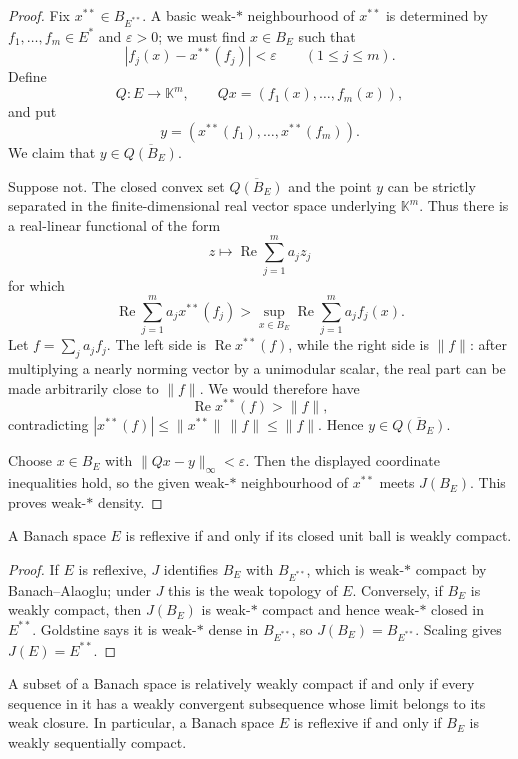 \begin{proof}
Fix $x^{**}\in B_{E^{**}}$.  A basic weak-$*$ neighbourhood of $x^{**}$ is
determined by $f_1,\ldots,f_m\in E^*$ and $\varepsilon>0$; we must find
$x\in B_E$ such that
\[
  |f_j(x)-x^{**}(f_j)|<\varepsilon
  \qquad(1\le j\le m).
\]
Define
\[
  Q\colon E\to\mathbb K^m,
  \qquad
  Qx=(f_1(x),\ldots,f_m(x)),
\]
and put
\[
  y=(x^{**}(f_1),\ldots,x^{**}(f_m)).
\]
We claim that $y\in\overline{Q(B_E)}$.

Suppose not.  The closed convex set $\overline{Q(B_E)}$ and the point $y$
can be strictly separated in the finite-dimensional real vector space
underlying $\mathbb K^m$.  Thus there is a real-linear functional of the form
\[
  z\longmapsto\operatorname{Re}\sum_{j=1}^m a_jz_j
\]
for which
\[
  \operatorname{Re}\sum_{j=1}^m a_jx^{**}(f_j)
  >\sup_{x\in B_E}\operatorname{Re}\sum_{j=1}^m a_jf_j(x).
\]
Let $f=\sum_j a_jf_j$.  The left side is
$\operatorname{Re}x^{**}(f)$, while the right side is $\|f\|$: after
multiplying a nearly norming vector by a unimodular scalar, the real part can
be made arbitrarily close to $\|f\|$.  We would therefore have
\[
  \operatorname{Re}x^{**}(f)>\|f\|,
\]
contradicting
$|x^{**}(f)|\le\|x^{**}\|\,\|f\|\le\|f\|$.  Hence
$y\in\overline{Q(B_E)}$.

Choose $x\in B_E$ with $\|Qx-y\|_\infty<\varepsilon$.  Then the displayed
coordinate inequalities hold, so the given weak-$*$ neighbourhood of
$x^{**}$ meets $J(B_E)$.  This proves weak-$*$ density.
\end{proof}

\begin{notetheorem}
A Banach space $E$ is reflexive if and only if its closed unit ball is weakly
compact.
\end{notetheorem}

\begin{proof}
If $E$ is reflexive, $J$ identifies $B_E$ with $B_{E^{**}}$, which is weak-$*$
compact by Banach--Alaoglu; under $J$ this is the weak topology of $E$.
Conversely, if $B_E$ is weakly compact, then $J(B_E)$ is weak-$*$ compact and
hence weak-$*$ closed in $E^{**}$.  Goldstine says it is weak-$*$ dense in
$B_{E^{**}}$, so $J(B_E)=B_{E^{**}}$.  Scaling gives $J(E)=E^{**}$.
\end{proof}

\begin{notetheorem}
A subset of a Banach space is relatively weakly compact if and only if every
sequence in it has a weakly convergent subsequence whose limit belongs to its
weak closure.  In particular, a Banach space $E$ is reflexive if and only if
$B_E$ is weakly sequentially compact.
\end{notetheorem}

